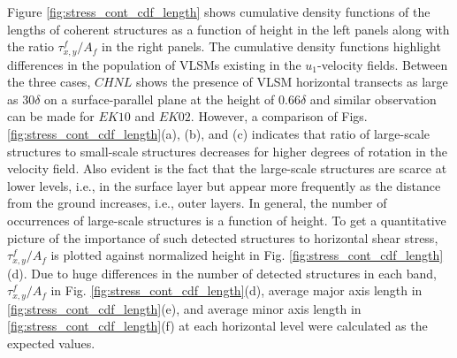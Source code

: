 Figure \ref{fig:stress_cont_cdf_length}  shows cumulative density functions of the lengths of coherent structures as a function of height in the left panels along with the ratio  $\tau_{x,y}^f/A_f$ in the right  panels. The cumulative density functions highlight differences in the population of VLSMs existing  in the $u_1$-velocity fields. Between the three cases, $CHNL$ shows the presence of VLSM horizontal transects  as large as $30\delta$ on a surface-parallel plane at the height of  $0.66\delta$ and similar observation can be made for $EK10$ and $EK02$. However,  a comparison of Figs. \ref{fig:stress_cont_cdf_length}(a), (b), and (c) indicates that ratio of large-scale structures to small-scale structures decreases for higher degrees of rotation  in the velocity field. Also evident is the fact that the large-scale structures are scarce at lower levels, i.e., in the surface layer but appear more frequently as the distance from the ground increases, i.e., outer layers. In general, the number of occurrences of large-scale structures is a function of height.  To get a quantitative picture of the importance of such detected structures to horizontal shear stress, $\tau_{x,y}^f/A_f$ is plotted against normalized height in Fig. \ref{fig:stress_cont_cdf_length}(d).  Due to huge differences in the number of detected structures in each band, $\tau_{x,y}^f/A_f$ in Fig. \ref{fig:stress_cont_cdf_length}(d), average major axis length in \ref{fig:stress_cont_cdf_length}(e), and average minor axis length in \ref{fig:stress_cont_cdf_length}(f) at each horizontal level were calculated as the expected values. 
